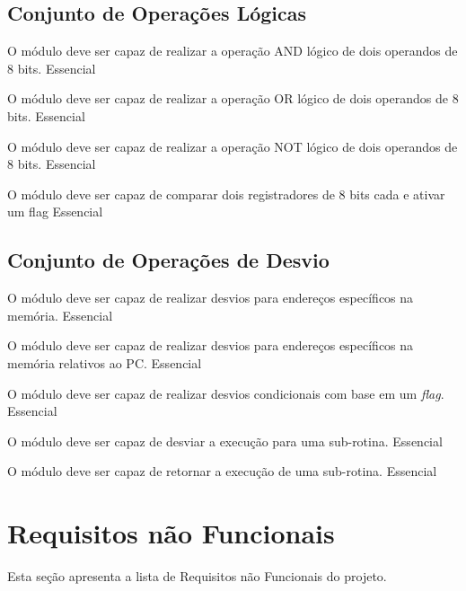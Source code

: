 \documentclass{article}
\begin{document}
  \subsection{Conjunto de Operações Lógicas} 
  
    \begin{functional}
      {O módulo deve ser capaz de realizar a operação AND lógico de dois operandos de 8 bits.}
      {Essencial}

      {O módulo deve ser capaz de realizar a operação OR lógico de dois operandos de 8 bits.}
      {Essencial}  
      
      {O módulo deve ser capaz de realizar a operação NOT lógico de dois operandos de 8 bits.}
      {Essencial}   
      
      {O módulo deve ser capaz de comparar dois registradores de 8 bits cada e ativar um flag}
      {Essencial}
    \end{functional}  
    
    \subsection{Conjunto de Operações de Desvio}
	    
	  \begin{functional}
		{O módulo deve ser capaz de realizar desvios para endereços específicos na memória.}
		{Essencial} 
		 
		 {O módulo deve ser capaz de realizar desvios para endereços específicos na memória relativos ao PC.}
		 {Essencial}
		 
		 {O módulo deve ser capaz de realizar desvios condicionais com base em um \textit{flag}.}
		 {Essencial}
		 
		 {O módulo deve ser capaz de desviar a execução para uma sub-rotina.}
		 {Essencial}
		 
		 {O módulo deve ser capaz de retornar a execução de uma sub-rotina.}
		 {Essencial}
	  \end{functional}

  \section{Requisitos não Funcionais}
  Esta seção apresenta a lista de Requisitos não Funcionais do projeto.
\end{document}
